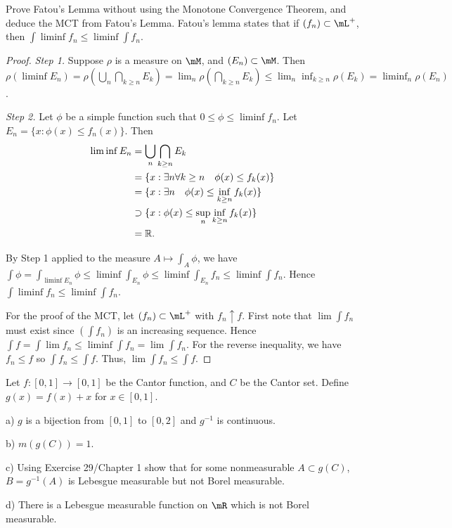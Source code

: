 \documentclass{article}
\begin{document}
 Prove Fatou's Lemma without using the Monotone Convergence Theorem, and deduce the MCT from Fatou's Lemma. Fatou's lemma states that if $(f_n) \subset \mL^+$, then $\int \liminf f_n \le \liminf \int f_n$.
\begin{proof}
\emph{Step 1.} Suppose $\rho$ is a measure on $\mM$, and $(E_n) \subset \mM$. Then $\rho(\liminf E_n) = \rho(\bigcup_n \bigcap_{k \ge n} E_k)  = \lim_n \rho(\bigcap_{k \ge n} E_k)  \le  \lim_n \inf_{k \ge n} \rho(E_k) = \liminf_n \rho(E_n)$.

\emph{Step 2.} Let $\phi$ be a simple function such that $0 \le \phi \le \liminf f_n$.  Let $E_n = \{x : \phi(x) \le f_n(x) \}$.  Then 
\begin{align*}
\liminf E_n & = \bigcup_n \bigcap_{k \ge n} E_k
\\ &  = \{x : \exists n \forall k \ge n \quad \phi(x) \le f_k(x) \} 
\\ &  = \{x : \exists n \quad \phi(x) \le \inf_{k \ge n} f_k(x) \} 
\\ & \supset \{x : \phi(x) \le \sup_n \inf_{k \ge n} f_k(x)\} 
\\ & = \mathbb{R}.
\end{align*}

 By Step 1 applied to the measure $A \mapsto \int_A \phi$, we have $\int \phi = \int_{\liminf E_n} \phi \le \liminf \int_{E_n} \phi \le \liminf \int_{E_n} f_n \le \liminf \int f_n$. Hence $\int \liminf f_n \le \liminf \int f_n$.

For the proof of the MCT, let $(f_n) \subset \mL^+$ with $f_n \uparrow f$. First note that $\lim \int f_n$ must exist since $(\int f_n)$ is an increasing sequence.  Hence $\int f = \int \lim f_n \le \liminf \int f_n = \lim \int f_n$. For the reverse inequality, we have $f_n \le f$ so $\int f_n \le \int f$. Thus, $\lim \int f_n \le \int f$.
\end{proof}

 Let $f : [0,1] \to [0,1]$ be the Cantor function, and $C$ be the Cantor set.  Define $g(x) = f(x) + x$ for $x \in [0,1]$.

a) $g$ is a bijection from $[0,1]$ to $[0,2]$ and $g^{-1}$ is continuous.

b) $m(g(C)) = 1$.

c) Using Exercise 29/Chapter 1 show that for some nonmeasurable $A \subset g(C)$, $B = g^{-1}(A)$ is Lebesgue measurable but not Borel measurable.

d) There is a Lebesgue measurable function on $\mR$ which is not Borel measurable.
\end{document}
